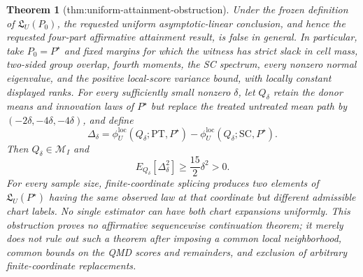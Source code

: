 \documentclass{article}
\newtheorem{theorem}{Theorem}
\begin{document}
\begin{theorem}[thm:uniform-attainment-obstruction]\label{thm:uniform-attainment-obstruction}
Under the frozen definition of \(\mathfrak L_U(P_0)\), the requested uniform asymptotic-linear conclusion, and hence the requested four-part affirmative attainment result, is false in general. In particular, take \(P_0=P^{\star}\) and fixed margins for which the witness has strict slack in cell mass, two-sided group overlap, fourth moments, the SC spectrum, every nonzero normal eigenvalue, and the positive local-score variance bound, with locally constant displayed ranks. For every sufficiently small nonzero \(\delta\), let \(Q_\delta\) retain the donor means and innovation laws of \(P^{\star}\) but replace the treated untreated mean path by \((-2\delta,-4\delta,-4\delta)\), and define \[\Delta_\delta=\phi_U^{\mathrm{loc}}(Q_\delta;\mathrm{PT},P^{\star})-\phi_U^{\mathrm{loc}}(Q_\delta;\mathrm{SC},P^{\star}).\] Then \(Q_\delta\in\mathcal M_I\) and \[E_{Q_\delta}[\Delta_\delta^2]\ge\frac{15}{2}\delta^2>0.\] For every sample size, finite-coordinate splicing produces two elements of \(\mathfrak L_U(P^{\star})\) having the same observed law at that coordinate but different admissible chart labels. No single estimator can have both chart expansions uniformly. This obstruction proves no affirmative sequencewise continuation theorem; it merely does not rule out such a theorem after imposing a common local neighborhood, common bounds on the QMD scores and remainders, and exclusion of arbitrary finite-coordinate replacements.
\end{theorem}
\end{document}
